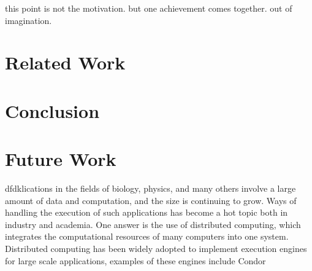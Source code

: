 \documentclass{article}
\begin{document}
this point is not the motivation. but one achievement comes together. out of imagination.\\

\section{Related Work }

\section{Conclusion}

\section{Future Work}




dfdk\cite{Laboratories79make}lications in the fields of biology, physics, and many others involve a large amount of data and computation, and the size is continuing to grow. Ways of handling the execution of such applications has become a hot topic both in industry and academia. One answer is the use of distributed computing, which integrates the computational resources of many computers into one system. Distributed computing has been widely adopted to implement execution engines for large scale applications, examples of these engines include Condor\\



\end{document}
